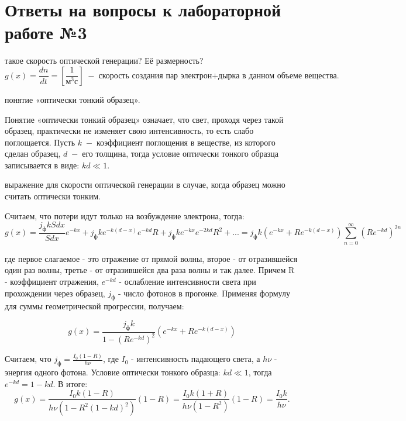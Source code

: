 \documentclass[a4paper, 12pt]{article}
\begin{document}
\section{Ответы на вопросы к лабораторной работе №3}
\begin{enumerate}
 такое скорость оптической генерации? Её размерность?
$$ g(x)= \frac{dn}{dt}=[\frac{1}{\text{м}^3\text{с}}] \; - \; \text{скорость создания пар электрон+дырка в данном объеме вещества}.$$   
    
 понятие «оптически тонкий образец».

Понятие «оптически тонкий образец» означает, что свет, проходя через такой образец, практически не изменяет свою интенсивность, то есть слабо поглощается. Пусть $k \; - \;$коэффициент поглощения в веществе, из которого сделан образец, $d \; - \;$его толщина, тогда условие оптически тонкого образца записывается в виде: $kd \ll 1$.


 выражение для скорости оптической генерации в случае, когда образец можно считать оптически тонким.

Считаем, что потери идут только на возбуждение электрона, тогда:
$$g(x)=\frac{j_{\text{ф}}kSdx}{Sdx}e^{-kx} + j_{\text{ф}}ke^{-k(d-x)}e^{-kd}R + j_{\text{ф}}ke^{-kx}e^{-2kd}R^2 + ...= j_{\text{ф}}k (e^{-kx}+Re^{-k(d-x)}) \sum \limits_{n=0}^{\infty} (Re^{-kd})^{2n}$$

где первое слагаемое - это отражение от прямой волны, второе - от отразившейся один раз волны, третье - от отразившейся два раза волны и так далее. Причем R - коэффициент отражения, $e^{-kd}$ - ослабление интенсивности света при прохождении через образец, $j_{\text{ф}}$ - число фотонов в прогонке. Применяя формулу для суммы геометрической прогрессии, получаем:

$$g(x)= \frac{j_{\text{ф}}k}{1-(Re^{-kd})^2}(e^{-kx}+Re^{-k(d-x)})$$

Считаем, что $j_{\text{ф}}=\frac{I_0(1-R)}{h\nu}$, где $I_0$ - интенсивность падающего света, а $h\nu$ - энергия одного фотона. Условие оптически тонкого образца: $kd \ll 1$, тогда $e^{-kd}=1-kd$. В итоге:
$$g(x)=\frac{I_0k(1-R)}{h\nu(1-R^2(1-kd)^2)}(1-R)=\frac{I_0k(1+R)}{h\nu(1-R^2)}(1-R)=\frac{I_0k}{h\nu}.$$


\end{enumerate}
\end{document}
